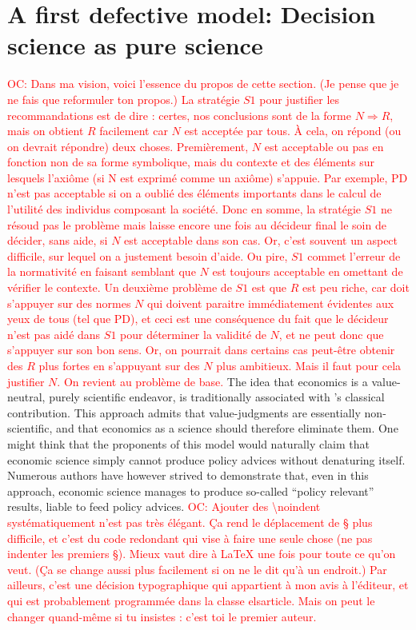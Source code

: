 \documentclass[preprint, french, english, 11pt]{elsarticle}%
\newcommand{\commentOC}[1]{\textcolor{red}{OC: #1}}
\begin{document}
\section{A first defective model: Decision science as pure science}
\commentOC{Dans ma vision, voici l’essence du propos de cette section. (Je pense que je ne fais que reformuler ton propos.) La stratégie $S1$ pour justifier les recommandations est de dire : certes, nos conclusions sont de la forme $N ⇒ R$, mais on obtient $R$ facilement car $N$ est acceptée par tous. À cela, on répond (ou on devrait répondre) deux choses. Premièrement, $N$ est acceptable ou pas en fonction non de sa forme symbolique, mais du contexte et des éléments sur lesquels l’axiôme (si N est exprimé comme un axiôme) s’appuie. Par exemple, PD n’est pas acceptable si on a oublié des éléments importants dans le calcul de l’utilité des individus composant la société. Donc en somme, la stratégie $S1$ ne résoud pas le problème mais laisse encore une fois au décideur final le soin de décider, sans aide, si $N$ est acceptable dans son cas. Or, c’est souvent un aspect difficile, sur lequel on a justement besoin d’aide. Ou pire, $S1$ commet l’erreur de la normativité en faisant semblant que $N$ est toujours acceptable en omettant de vérifier le contexte. Un deuxième problème de $S1$ est que $R$ est peu riche, car doit s’appuyer sur des normes $N$ qui doivent paraitre immédiatement évidentes aux yeux de tous (tel que PD), et ceci est une conséquence du fait que le décideur n’est pas aidé dans $S1$ pour déterminer la validité de $N$, et ne peut donc que s’appuyer sur son bon sens. Or, on pourrait dans certains cas peut-être obtenir des $R$ plus fortes en s’appuyant sur des $N$ plus ambitieux. Mais il faut pour cela justifier $N$. On revient au problème de base.}
\noindent The idea that economics is a value-neutral, purely scientific endeavor, is traditionally associated with \cite{robbins_essay_2007}'s classical contribution. This approach admits that value-judgments are essentially non-scientific, and that economics as a science should therefore eliminate them. One might think that the proponents of this model would naturally claim that economic science simply cannot produce policy advices without denaturing itself. Numerous authors have however strived to demonstrate that, even in this approach, economic science manages to produce so-called “policy relevant” results, liable to feed policy advices.
\commentOC{Ajouter des \textbackslash noindent systématiquement n’est pas très élégant. Ça rend le déplacement de § plus difficile, et c’est du code redondant qui vise à faire une seule chose (ne pas indenter les premiers §). Mieux vaut dire à \LaTeX{} une fois pour toute ce qu’on veut. (Ça se change aussi plus facilement si on ne le dit qu’à un endroit.) Par ailleurs, c’est une décision typographique qui appartient à mon avis à l’éditeur, et qui est probablement programmée dans la classe elsarticle. Mais on peut le changer quand-même si tu insistes : c’est toi le premier auteur.}
\end{document}
